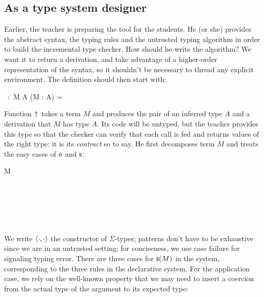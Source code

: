 \documentclass{llncs}
\begin{document}
\subsection{As a type system designer}
\label{sec:lang-incr}

Earlier, the teacher is preparing the tool for the students. He (or
she) provides the abstract syntax, the typing rules and the untrusted
typing algorithm in order to build the incremental type checker. How
should he write the algorithm? We want it to return a derivation, and
take advantage of a higher-order representation of the syntax, so it
shouldn't be necessary to thread any explicit environment. The
definition should then start with:

\begin{mathleft}
  \finfer{}\ :\ \prd M {} \sig A {} (\vdash M : A) =
\end{mathleft}

\noindent
Function $\uparrow\!{}$ takes a term $M$ and produces the pair of an
inferred type $A$ and a derivation that $M$ has type $A$. Its code
will be untyped, but the teacher provides this type so that the
checker can verify that each call is fed and returns values of the
right type: it is its \emph{contract} so to say. He first decomposes
term $M$ and treats the easy cases of $\text{\textsf{o}}$ and $\text{\textsf{s}}$:

\begin{mathleft}
  \lamd M  \\
  \quad\caseb{\z}  \\
  \quad{}
   \\
  \quad\quad{}
   \\
  \quad\quad{}
   \\
  \quad\quad{}
   \\
\end{mathleft}

\noindent
We write $\langle{\cdot}, {\cdot}\rangle$ the constructor of $\Sigma$-types;
patterns don't have to be exhaustive since we are in an untrusted
setting; for conciseness, we use case failure for signaling typing
error. There are three cases for $\text{\textsf{s}} ({M})$ in the system, corresponding
to the three rules in the declarative system. For the application
case, we rely on the well-known property that we may need to insert a
coercion from the actual type of the argument to its expected type:
\end{document}
